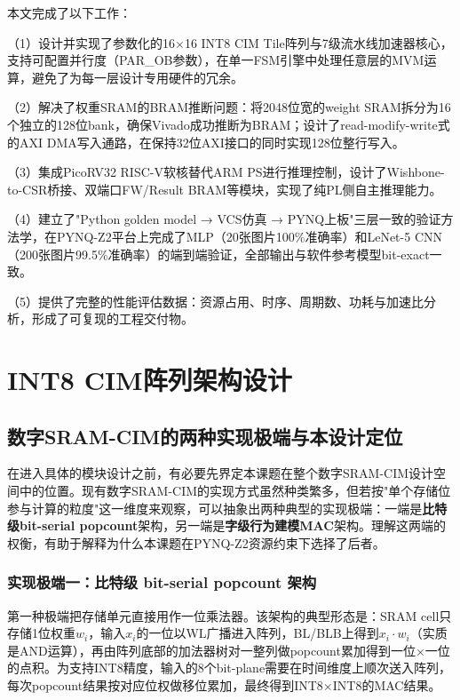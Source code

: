\documentclass[12pt, a4paper]{article}
\begin{document}
本文完成了以下工作：

（1）设计并实现了参数化的16×16 INT8 CIM Tile阵列与7级流水线加速器核心，支持可配置并行度（PAR\_OB参数），在单一FSM引擎中处理任意层的MVM运算，避免了为每一层设计专用硬件的冗余。

（2）解决了权重SRAM的BRAM推断问题：将2048位宽的weight SRAM拆分为16个独立的128位bank，确保Vivado成功推断为BRAM；设计了read-modify-write式的AXI DMA写入通路，在保持32位AXI接口的同时实现128位整行写入。

（3）集成PicoRV32 RISC-V软核替代ARM PS进行推理控制，设计了Wishbone-to-CSR桥接、双端口FW/Result BRAM等模块，实现了纯PL侧自主推理能力。

（4）建立了"Python golden model → VCS仿真 → PYNQ上板"三层一致的验证方法学，在PYNQ-Z2平台上完成了MLP（20张图片100\%准确率）和LeNet-5 CNN（200张图片99.5\%准确率）的端到端验证，全部输出与软件参考模型bit-exact一致。

（5）提供了完整的性能评估数据：资源占用、时序、周期数、功耗与加速比分析，形成了可复现的工程交付物。

\section{INT8 CIM阵列架构设计}

\subsection{数字SRAM-CIM的两种实现极端与本设计定位}
\label{sec:two_extremes}

在进入具体的模块设计之前，有必要先界定本课题在整个数字SRAM-CIM设计空间中的位置。现有数字SRAM-CIM的实现方式虽然种类繁多，但若按"单个存储位参与计算的粒度"这一维度来观察，可以抽象出两种典型的实现极端：一端是\textbf{比特级bit-serial popcount}架构，另一端是\textbf{字级行为建模MAC}架构。理解这两端的权衡，有助于解释为什么本课题在PYNQ-Z2资源约束下选择了后者。

\subsubsection{实现极端一：比特级 bit-serial popcount 架构}

第一种极端把存储单元直接用作一位乘法器。该架构的典型形态是：SRAM cell只存储1位权重$w_i$，输入$x_i$的一位以WL广播进入阵列，BL/BLB上得到$x_i \cdot w_i$（实质是AND运算），再由阵列底部的加法器树对一整列做popcount累加得到一位×一位的点积。为支持INT8精度，输入的8个bit-plane需要在时间维度上顺次送入阵列，每次popcount结果按对应位权做移位累加，最终得到INT8$\times$INT8的MAC结果。
\end{document}
